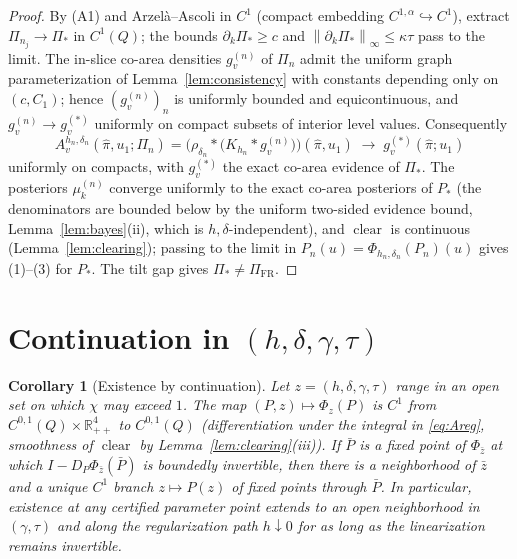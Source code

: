 \documentclass[11pt]{article}
\newtheorem{corollary}{Corollary}
\theoremstyle{definition}
\newcommand{\R}{\mathbb{R}}
\newcommand{\clear}{\operatorname{clear}}
\newcommand{\norm}[1]{\left\lVert #1 \right\rVert}
\begin{document}
\begin{proof}
By (A1) and Arzel\`a--Ascoli in $C^{1}$ (compact embedding
$C^{1,\alpha}\hookrightarrow C^1$), extract $\Pi_{n_j}\to\Pi_\ast$ in
$C^1(Q)$; the bounds $\partial_k\Pi_\ast\ge c$ and
$\norm{\partial_k\Pi_\ast}_\infty\le\kappa\tau$ pass to the limit. The
in-slice co-area densities $g^{(n)}_v$ of $\Pi_n$ admit the uniform graph
parameterization of Lemma~\ref{lem:consistency} with constants depending
only on $(c,C_1)$; hence $(g^{(n)}_v)_n$ is uniformly bounded and
equicontinuous, and $g^{(n)}_v\to g^{(\ast)}_v$ uniformly on compact subsets
of interior level values. Consequently
\[
A^{h_n,\delta_n}_v(\hat\pi,u_1;\Pi_n)
=\big(\rho_{\delta_n}\!*\!\big(K_{h_n}\!*g^{(n)}_v\big)\big)(\hat\pi,u_1)
\;\longrightarrow\;g^{(\ast)}_v(\hat\pi;u_1)
\]
uniformly on compacts, with $g^{(\ast)}_v$ the exact co-area evidence of
$\Pi_\ast$. The posteriors $\mu^{(n)}_k$ converge uniformly to the exact
co-area posteriors of $P_\ast$ (the denominators are bounded below by the
uniform two-sided evidence bound, Lemma~\ref{lem:bayes}(ii), which is
$h,\delta$-independent), and $\clear$ is continuous
(Lemma~\ref{lem:clearing}); passing to the limit in
$P_n(u)=\Phi_{h_n,\delta_n}(P_n)(u)$ gives (1)--(3) for $P_\ast$. The tilt
gap gives $\Pi_\ast\neq\Pi_{\mathrm{FR}}$.
\end{proof}

\section{Continuation in $(h,\delta,\gamma,\tau)$}\label{sec:continuation}

\begin{corollary}[Existence by continuation]\label{cor:continuation}
Let $z=(h,\delta,\gamma,\tau)$ range in an open set on which
$\chi$ may exceed $1$. The map $(P,z)\mapsto\Phi_z(P)$ is $C^1$ from
$C^{0,1}(Q)\times\R^4_{++}$ to $C^{0,1}(Q)$ (differentiation under the
integral in \eqref{eq:Areg}, smoothness of $\clear$ by
Lemma~\ref{lem:clearing}(iii)). If $\bar P$ is a fixed point of
$\Phi_{\bar z}$ at which $I-D_P\Phi_{\bar z}(\bar P)$ is boundedly
invertible, then there is a neighborhood of $\bar z$ and a unique $C^1$
branch $z\mapsto P(z)$ of fixed points through $\bar P$. In particular,
existence at any certified parameter point extends to an open neighborhood
in $(\gamma,\tau)$ and along the regularization path $h\downarrow0$ for as
long as the linearization remains invertible.
\end{corollary}
\end{document}
